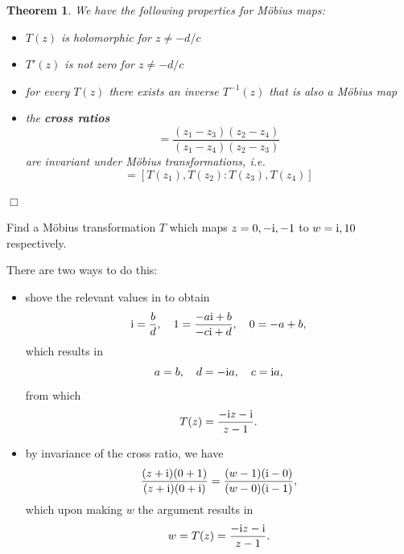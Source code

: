 \documentclass[letter-paper]{tufte-book}
\newtheorem{theorem}{\color{pastel-blue}Theorem}[section]
\newenvironment{example}[1][Example]{\begin{trivlist}
\item[\hskip \labelsep {\bfseries #1}]}{\end{trivlist}}
\newcommand{\zi}{{\rm i}}
\newcommand{\qedwhite}{\hfill \ensuremath{\Box}}
\begin{document}
\begin{theorem}
  We have the following properties for M\"obius maps:
  \begin{itemize}
    \item $T(z)$ is holomorphic for $z \neq -d/c$
    \item $T'(z)$ is not zero for $z \neq -d/c$ 
    \item for every $T(z)$ there exists an inverse $T^{-1}(z)$ that is also a
    M\"obius map
    \item the \textbf{cross ratios}
    \begin{equation}
      [z_1, z_2 : z_3, z_4] = \frac{(z_1 - z_3)(z_2 - z_4)}{(z_1 - z_4)(z_2 - z_3)}
    \end{equation}
    are invariant under M\"obius transformations, i.e.
    \begin{equation*}
      [z_1, z_2 : z_3, z_4] = [T(z_1), T(z_2) : T(z_3), T(z_4)]
    \end{equation*}
  \end{itemize}
  \qedwhite
\end{theorem}

\begin{example}
  Find a M\"obius transformation $T$ which maps $z=0, -\zi, -1$ to $w = \zi, 1
  0$ respectively.
  
  There are two ways to do this:
  \begin{itemize}
    \item shove the relevant values in to obtain
    \begin{equation*}
      \zi = \frac{b}{d}, \quad 1 = \frac{-a\zi + b}{-c\zi + d}, \quad 0 = -a + b,
    \end{equation*}
    which results in
    \begin{equation*}
      a = b,  \quad d= - \zi a, \quad c= \zi a,
    \end{equation*}
    from which
    \begin{equation*}
      T(z) = \frac{-\zi z - \zi}{z - 1}.
    \end{equation*}
    
    \item by invariance of the cross ratio, we have
    \begin{equation*}
      \frac{(z + \zi)(0 + 1)}{(z + \zi)(0 + \zi)} = \frac{(w - 1)(\zi - 0)}{(w - 0)(\zi - 1)},
    \end{equation*}
    which upon making $w$ the argument results in
    \begin{equation*}
      w = T(z) = \frac{-\zi z - \zi}{z - 1}.
    \end{equation*}
  \end{itemize}
\end{example}
\end{document}
